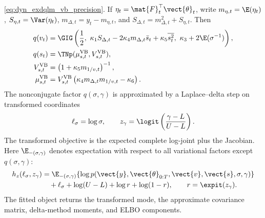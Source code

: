 \eqref{eq:dyn_exdqlm_vb_precision}.
If $\eta_t=\mat{F}_t^\top\vect{\theta}_t$, write
$m_{\eta,t}=\E(\eta_t)$, $S_{\eta,t}=\Var(\eta_t)$,
$m_{\Delta,t}=y_t-m_{\eta,t}$, and
$S_{\Delta,t}=m_{\Delta,t}^2+S_{\eta,t}$. Then
\begin{align}
q(v_t)&=\GIG\left(
\frac{1}{2},\
\kappa_1S_{\Delta,t}-2\kappa_4m_{\Delta,t}\bar s_t+\kappa_5\overline{s_t^2},\
\kappa_3+2\E(\sigma^{-1})
\right),\\
q(s_t)&=\TNp(\mu_{s,t}^{\mathrm{VB}},V_{s,t}^{\mathrm{VB}}),\\
V_{s,t}^{\mathrm{VB}}
&=\left(1+\kappa_5m_{1/v,t}\right)^{-1},\\
\mu_{s,t}^{\mathrm{VB}}
&=V_{s,t}^{\mathrm{VB}}
\left(\kappa_4m_{\Delta,t}m_{1/v,t}-\kappa_6\right).
\label{eq:dyn_exdqlm_vb_vs}
\end{align}
The nonconjugate factor $q(\sigma,\gamma)$ is approximated by a
Laplace--delta step on transformed coordinates
\begin{equation}
\ell_\sigma=\log\sigma,\qquad
z_\gamma=\logit\left(\frac{\gamma-L}{U-L}\right).
\label{eq:dyn_exdqlm_ld_transform}
\end{equation}
The transformed objective is the expected complete log-joint plus the
Jacobian. Here $\E_{-(\sigma,\gamma)}$ denotes expectation with respect to all
variational factors except $q(\sigma,\gamma)$:
\begin{align}
h_z(\ell_\sigma,z_\gamma)
&=
\E_{-(\sigma,\gamma)}\{\log p(\vect{y},\vect{\theta}_{0:T},
\vect{v},\vect{s},\sigma,\gamma)\} \nonumber\\
&\quad
+\ell_\sigma+\log(U-L)+\log r+\log(1-r),
\qquad r=\expit(z_\gamma).
\label{eq:dyn_exdqlm_ld_objective}
\end{align}
The fitted object returns the transformed mode, the approximate covariance
matrix, delta-method moments, and ELBO components.

